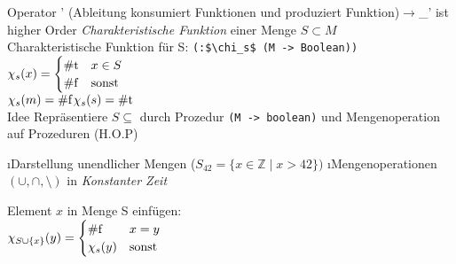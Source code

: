 Operator ' (Ableitung konsumiert Funktionen und produziert Funktion)$\rightarrow$\_' ist higher Order
\emph{Charakteristische Funktion} einer Menge $S \subset M$
\\
Charakteristische Funktion für S: \lstinline[mathescape]|(:$\chi_s$ (M -> Boolean))|\\
$\chi_s(x) = \begin{cases}
\t{\lstinline|#t|} & x \in S\\
\t{\lstinline|#f|} & \t{sonst}
\end{cases}$\\
$\chi_s(m) = \t{\lstinline|#f|}$\qquad $\chi_s(s) = \t{\lstinline|#t|}$\\
Idee Repräsentiere $S \subseteq$ durch Prozedur \lstinline|(M -> boolean)| und Mengenoperation auf Prozeduren (H.O.P)
\begin{enumerate}[:-)]
\i Darstellung unendlicher Mengen ($S_42 = \{x \in \mathbb{Z} \mid x > 42 \})$
\i Mengenoperationen $(\cup,\cap,\setminus)$ in \emph{Konstanter Zeit}
\end{enumerate}
Element $x$ in Menge S einfügen:\\
$\chi_{S \cup \{ x \}}(y) = \begin{cases}
\t{\lstinline|#f|} & x =y\\
\chi_s(y) & \t{sonst}
\end{cases}$
